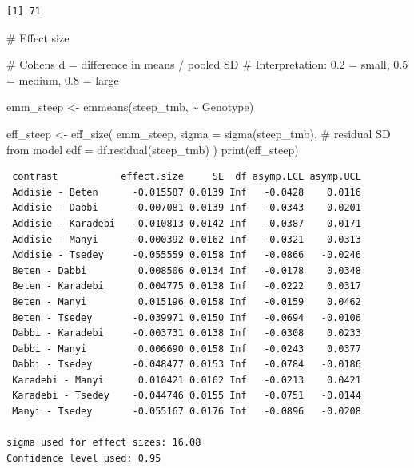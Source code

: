 \documentclass[
  letterpaper,
  DIV=11,
  numbers=noendperiod]{scrartcl}
\newenvironment{Shaded}{\begin{snugshade}}{\end{snugshade}}
\newcommand{\AttributeTok}[1]{\textcolor[rgb]{0.40,0.45,0.13}{#1}}
\newcommand{\CommentTok}[1]{\textcolor[rgb]{0.37,0.37,0.37}{#1}}
\newcommand{\FunctionTok}[1]{\textcolor[rgb]{0.28,0.35,0.67}{#1}}
\newcommand{\NormalTok}[1]{\textcolor[rgb]{0.00,0.23,0.31}{#1}}
\newcommand{\OtherTok}[1]{\textcolor[rgb]{0.00,0.23,0.31}{#1}}
\newcommand{\SpecialCharTok}[1]{\textcolor[rgb]{0.37,0.37,0.37}{#1}}
\begin{document}
\begin{verbatim}
[1] 71
\end{verbatim}

\begin{Shaded}
\begin{Highlighting}[]
\CommentTok{\# Effect size}

\CommentTok{\# Cohen\textquotesingle{}s d = difference in means / pooled SD}
\CommentTok{\# Interpretation: 0.2 = small, 0.5 = medium, 0.8 = large}

\NormalTok{emm\_steep }\OtherTok{\textless{}{-}} \FunctionTok{emmeans}\NormalTok{(steep\_tmb, }\SpecialCharTok{\textasciitilde{}}\NormalTok{ Genotype)}

\NormalTok{eff\_steep }\OtherTok{\textless{}{-}} \FunctionTok{eff\_size}\NormalTok{(}
\NormalTok{  emm\_steep,}
  \AttributeTok{sigma =} \FunctionTok{sigma}\NormalTok{(steep\_tmb),   }\CommentTok{\# residual SD from model}
  \AttributeTok{edf   =} \FunctionTok{df.residual}\NormalTok{(steep\_tmb)}
\NormalTok{)}
\FunctionTok{print}\NormalTok{(eff\_steep)}
\end{Highlighting}
\end{Shaded}

\begin{verbatim}
 contrast           effect.size     SE  df asymp.LCL asymp.UCL
 Addisie - Beten      -0.015587 0.0139 Inf   -0.0428    0.0116
 Addisie - Dabbi      -0.007081 0.0139 Inf   -0.0343    0.0201
 Addisie - Karadebi   -0.010813 0.0142 Inf   -0.0387    0.0171
 Addisie - Manyi      -0.000392 0.0162 Inf   -0.0321    0.0313
 Addisie - Tsedey     -0.055559 0.0158 Inf   -0.0866   -0.0246
 Beten - Dabbi         0.008506 0.0134 Inf   -0.0178    0.0348
 Beten - Karadebi      0.004775 0.0138 Inf   -0.0222    0.0317
 Beten - Manyi         0.015196 0.0158 Inf   -0.0159    0.0462
 Beten - Tsedey       -0.039971 0.0150 Inf   -0.0694   -0.0106
 Dabbi - Karadebi     -0.003731 0.0138 Inf   -0.0308    0.0233
 Dabbi - Manyi         0.006690 0.0158 Inf   -0.0243    0.0377
 Dabbi - Tsedey       -0.048477 0.0153 Inf   -0.0784   -0.0186
 Karadebi - Manyi      0.010421 0.0162 Inf   -0.0213    0.0421
 Karadebi - Tsedey    -0.044746 0.0155 Inf   -0.0751   -0.0144
 Manyi - Tsedey       -0.055167 0.0176 Inf   -0.0896   -0.0208

sigma used for effect sizes: 16.08 
Confidence level used: 0.95 
\end{verbatim}
\end{document}
